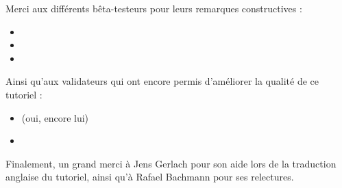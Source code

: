\begin{Information}
Merci aux différents bêta-testeurs pour leurs remarques constructives :

\begin{itemize}
\item {}
\item {}
\item {}
\end{itemize}
Ainsi qu'aux validateurs qui ont encore permis d'améliorer la qualité de ce tutoriel :

\begin{itemize}
\item {} (oui, encore lui)
\item {}
\end{itemize}
Finalement, un grand merci à Jens Gerlach pour son aide lors de la traduction
anglaise du tutoriel, ainsi qu'à Rafael Bachmann pour ses relectures.
\end{Information}
